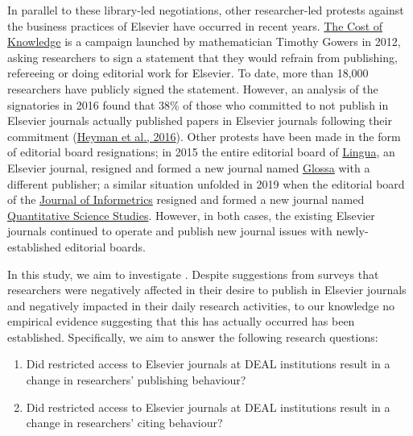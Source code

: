 \documentclass[
]{article}
\providecommand{\tightlist}{%
  \setlength{\itemsep}{0pt}\setlength{\parskip}{0pt}}
\begin{document}
In parallel to these library-led negotiations, other researcher-led protests against the business practices of Elsevier have occurred in recent years. \href{http://thecostofknowledge.com/}{The Cost of Knowledge} is a campaign launched by mathematician Timothy Gowers in 2012, asking researchers to sign a statement that they would refrain from publishing, refereeing or doing editorial work for Elsevier. To date, more than 18,000 researchers have publicly signed the statement. However, an analysis of the signatories in 2016 found that 38\% of those who committed to not publish in Elsevier journals actually published papers in Elsevier journals following their commitment (\href{https://doi.org/10.3389/frma.2016.00007}{Heyman et al., 2016}). Other protests have been made in the form of editorial board resignations; in 2015 the entire editorial board of \href{https://www.journals.elsevier.com/lingua}{Lingua}, an Elsevier journal, resigned and formed a new journal named \href{https://www.glossa-journal.org/}{Glossa} with a different publisher; a similar situation unfolded in 2019 when the editorial board of the \href{https://www.journals.elsevier.com/journal-of-informetrics}{Journal of Informetrics} resigned and formed a new journal named \href{https://direct.mit.edu/qss}{Quantitative Science Studies}. However, in both cases, the existing Elsevier journals continued to operate and publish new journal issues with newly-established editorial boards.

In this study, we aim to investigate . Despite suggestions from surveys that researchers were negatively affected in their desire to publish in Elsevier journals and negatively impacted in their daily research activities, to our knowledge no empirical evidence suggesting that this has actually occurred has been established. Specifically, we aim to answer the following research questions:

\begin{enumerate}
\def\labelenumi{\arabic{enumi}.}
\tightlist
\item
  Did  restricted access to Elsevier journals at DEAL institutions result in a change in researchers' publishing behaviour?
\item
  Did  restricted access to Elsevier journals at DEAL institutions result in a change in researchers' citing behaviour?
\end{enumerate}
\end{document}
